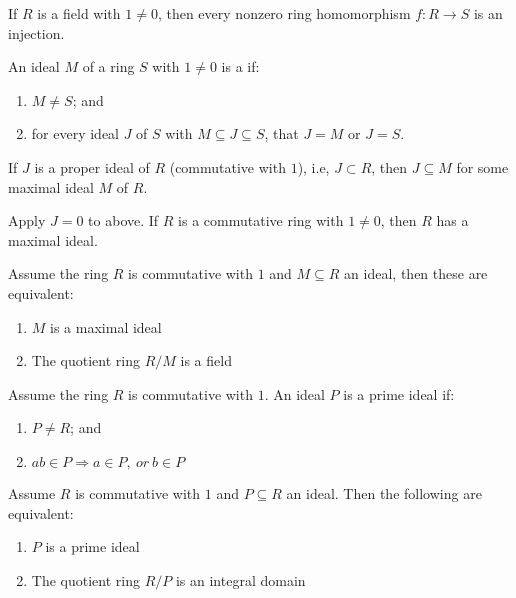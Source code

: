 \begin{corollary}
If $R$ is a field with $1 \neq 0$, then every nonzero ring homomorphism $f: R \rightarrow S$ is an injection.
\end{corollary}

\begin{definition}
An ideal $M$ of a ring $S$ with $1 \neq 0$ is a  if:
\begin{enumerate}[label=(\roman*)]
\item $M \neq S$; and
\item for every ideal $J$ of $S$ with $M \subseteq J \subseteq S$, that $J=M$ or $J=S$.
\end{enumerate}
\end{definition}


\begin{proposition}
If $J$ is a proper ideal of $R$ (commutative with $1$), i.e, $J \subset R$, then $J \subseteq M$ for some maximal ideal $M$ of $R$.
\end{proposition}


\begin{corollary}
Apply $J=0$ to above. If $R$ is a commutative ring with 	$1 \neq 0$, then $R$ has a maximal ideal.
\end{corollary}


\begin{proposition}
Assume the ring $R$ is commutative with $1$	and $M \subseteq R$ an ideal, then these are equivalent:
\begin{enumerate}[label=(\roman*)]
\item $M$ is a maximal ideal
\item The quotient ring $R/M$ is a field
\end{enumerate}
\end{proposition}


\begin{definition}
Assume the ring $R$ is commutative with $1$. An ideal $P$ is a prime ideal if:
\begin{enumerate}[label=(\roman*)]
\item $P \neq R$; and
\item $ab \in P \Rightarrow a \in P, \ or \ b \in P$
\end{enumerate}
\end{definition}


\begin{proposition}
Assume $R$ is commutative with $1$ and $P \subseteq R$ an ideal. Then the following are equivalent:
\begin{enumerate}[label=(\roman*)]
\item $P$ is a prime ideal
\item The quotient ring $R/P$ is an integral domain
\end{enumerate}
\end{proposition}


